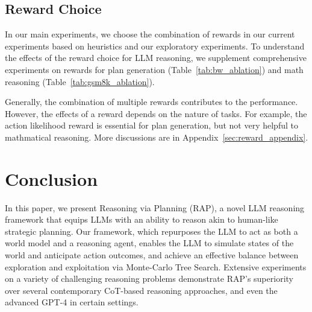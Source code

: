 

\subsection{Reward Choice}

\label{sec:ablation}
In our main experiments, we choose the combination of rewards in our current experiments based on heuristics and our exploratory experiments. To understand the effects of the reward choice for LLM reasoning, we supplement comprehensive experiments on rewards for plan generation (Table~\ref{tab:bw_ablation}) and math reasoning (Table~\ref{tab:gsm8k_ablation}).

Generally, the combination of multiple rewards contributes to the performance. However, the effects of a reward depends on the nature of tasks. For example, the action likelihood reward is essential for plan generation, but not very helpful to mathmatical reasoning. More discussions are in Appendix~\ref{sec:reward_appendix}.


\section{Conclusion}




In this paper, we present Reasoning via Planning (RAP), a novel LLM reasoning framework that equips LLMs with an ability to reason akin to human-like strategic planning. Our framework, which repurposes the LLM to act as both a world model and a reasoning agent, enables the LLM to simulate states of the world and anticipate action outcomes, and achieve an effective balance between exploration and exploitation via Monte-Carlo Tree Search. Extensive experiments on a variety of challenging reasoning problems demonstrate RAP's superiority over several contemporary CoT-based reasoning approaches, and even the advanced GPT-4 in certain settings. 

